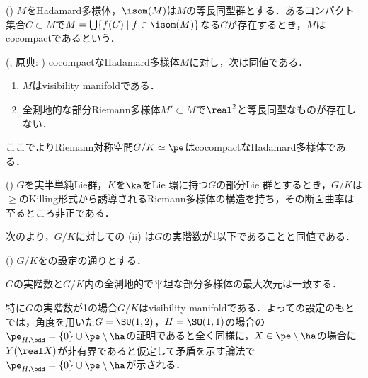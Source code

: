 \begin{defi}({\cite[p.~202]{bh99}})
  $M$をHadamard多様体，$\isom(M)$は$M$の等長同型群とする．あるコンパクト集合$C\subset M$で$ M = \bigcup\{f(C)\mid f\in \isom(M) \}  $なる$C$が存在するとき，$M$はcocompactであるという．
\end{defi}

\begin{thm}{({\cite[p.~296, 9.33~Theorem]{bh99}, 原典: \cite[Theorem~4.1]{e72-2}})}\label{thm:visibility-and-rank}  
  cocompactなHadamard多様体$M$に対し，次は同値である．
  \begin{enumerate}
    \renewcommand{\labelenumi}{(\roman{enumi})}
  \item $M$はvisibility manifoldである．
  \item 全測地的な部分Riemann多様体$M'\subset M$で$\real^2$と等長同型なものが存在しない．
  \end{enumerate}
\end{thm}

ここでよりRiemann対称空間$G/K\simeq \pe$はcocompactなHadamard多様体である．
\begin{thm}(\cite[p.~241, Theorem~3.1]{hel01})\label{thm:non-positivity}
  $G$を実半単純Lie群，$K$を$\ka$をLie 環に持つ$G$の部分Lie 群とするとき，$G/K$は$\ge$のKilling形式から誘導されるRiemann多様体の構造を持ち，その断面曲率は至るところ非正である．
\end{thm}

次のより，$G/K$に対しての (ii) は$G$の実階数が1以下であることと同値である．

\begin{thm}({\cite[p.~245, Proposition~6.1]{hel01}})\label{thm:rank-of-symm-sp}
  $G/K$をの設定の通りとする．

  $G$の実階数と$G/K$内の全測地的で平坦な部分多様体の最大次元は一致する．
\end{thm}

特に$G$の実階数が1の場合$G/K$はvisibility manifoldである．よっての設定のもとでは，角度を用いた$G = \SU(1,2) $，$H= \SO(1,1)$の場合の$\pe_{H,\bdd} = \{0\}\cup\pe\setminus\ha $の証明であると全く同様に，$X\in \pe\setminus\ha $の場合に$Y(\real X) $が非有界であると仮定して矛盾を示す論法で$\pe_{H,\bdd} =\{0\}\cup\pe\setminus\ha $が示される．
